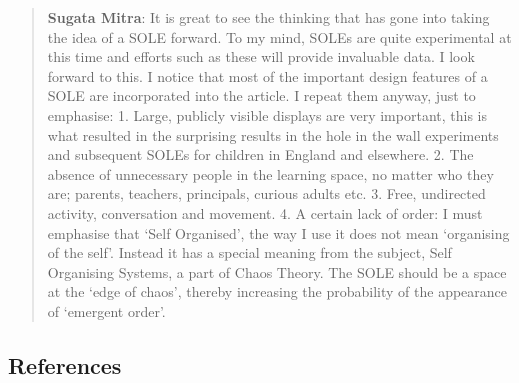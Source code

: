 \begin{quote}
\textbf{Sugata Mitra}: It is great to see the thinking that has gone
into taking the idea of a SOLE forward. To my mind, SOLEs are quite
experimental at this time and efforts such as these will provide
invaluable data. I look forward to this. I notice that most of the
important design features of a SOLE are incorporated into the article. I
repeat them anyway, just to emphasise: 1. Large, publicly visible
displays are very important, this is what resulted in the surprising
results in the hole in the wall experiments and subsequent SOLEs for
children in England and elsewhere. 2. The absence of unnecessary people
in the learning space, no matter who they are; parents, teachers,
principals, curious adults etc. 3. Free, undirected activity,
conversation and movement. 4. A certain lack of order: I must emphasise
that `Self Organised', the way I use it does not mean `organising of the
self'. Instead it has a special meaning from the subject, Self
Organising Systems, a part of Chaos Theory. The SOLE should be a space
at the `edge of chaos', thereby increasing the probability of the
appearance of `emergent order'.
\end{quote}

\subsection{References}

